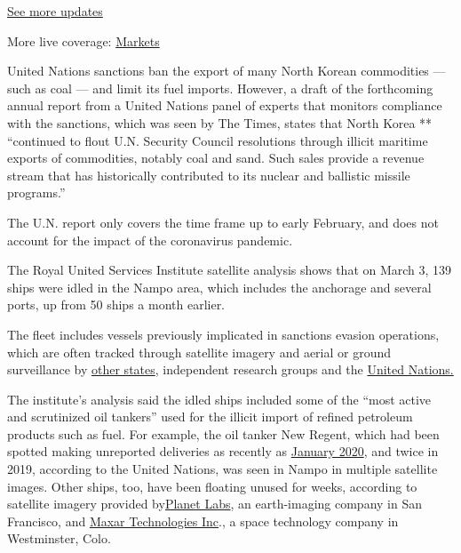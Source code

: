 \href{https://www.nytimes3xbfgragh.onion/2020/09/11/world/covid-19-coronavirus.html?action=click\&pgtype=Article\&state=default\&region=MAIN_CONTENT_1\&context=storylines_live_updates}{See
more updates}

More live coverage:
\href{https://www.nytimes3xbfgragh.onion/live/2020/09/11/business/stock-market-today-coronavirus?action=click\&pgtype=Article\&state=default\&region=MAIN_CONTENT_1\&context=storylines_live_updates}{Markets}

United Nations sanctions ban the export of many North Korean commodities
--- such as coal --- and limit its fuel imports. However, a draft of the
forthcoming annual report from a United Nations panel of experts that
monitors compliance with the sanctions, which was seen by The Times,
states that North Korea ** ``continued to flout U.N. Security Council
resolutions through illicit maritime exports of commodities, notably
coal and sand. Such sales provide a revenue stream that has historically
contributed to its nuclear and ballistic missile programs.''

The U.N. report only covers the time frame up to early February, and
does not account for the impact of the coronavirus pandemic.

The Royal United Services Institute satellite analysis shows that on
March 3, 139 ships were idled in the Nampo area, which includes the
anchorage and several ports, up from 50 ships a month earlier.

The fleet includes vessels previously implicated in sanctions evasion
operations, which are often tracked through satellite imagery and aerial
or ground surveillance by
\href{https://www.treasury.gov/resource-center/sanctions/Programs/Pages/dprk_vessels.aspx}{other
states}, independent research groups and the
\href{https://www.un.org/securitycouncil/sanctions/1718/panel_experts/reports}{United
Nations.}

The institute's analysis said the idled ships included some of the
``most active and scrutinized oil tankers'' used for the illicit import
of refined petroleum products such as fuel. For example, the oil tanker
New Regent, which had been spotted making unreported deliveries as
recently as
\href{https://rusi.org/publication/other-publications/project-sandstone-report-6-phantom-fleet-north-korea\%E2\%80\%99s-smugglers}{January
2020}, and twice in 2019, according to the United Nations, was seen in
Nampo in multiple satellite images. Other ships, too, have been floating
unused for weeks, according to satellite imagery provided
by\href{https://www.planet.com/}{Planet Labs}, an earth-imaging company
in San Francisco, and \href{https://www.maxar.com/}{Maxar Technologies
Inc}., a space technology company in Westminster, Colo.

